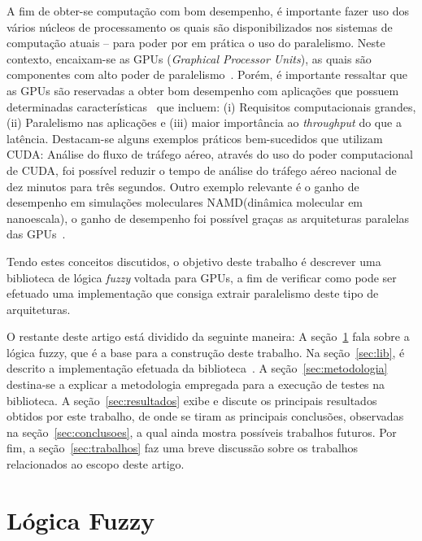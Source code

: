 \documentclass[12pt]{article}
\begin{document}
	A fim de obter-se computação com bom desempenho, é importante fazer uso dos vários núcleos de processamento os quais são disponibilizados nos sistemas de computação atuais -- para poder por em prática o uso do paralelismo. Neste contexto, encaixam-se as GPUs (\textit{Graphical Processor Units}), as quais são componentes com alto poder de paralelismo~\cite{sengupta:07}. Porém, é importante ressaltar que as GPUs são reservadas a obter bom desempenho com aplicações que possuem determinadas características~\cite{owens:08} que incluem: (i) Requisitos computacionais grandes, (ii) Paralelismo nas aplicações e (iii) maior importância ao \textit{throughput} do que a latência. Destacam-se alguns exemplos práticos bem-sucedidos que utilizam CUDA:
Análise do fluxo de tráfego aéreo, através do uso do poder computacional de CUDA, foi possível reduzir o tempo de análise do tráfego aéreo nacional
de dez minutos para três segundos. Outro exemplo relevante é o ganho de desempenho em simulações moleculares NAMD(dinâmica molecular em nanoescala), o ganho de desempenho foi possível graças as arquiteturas paralelas das GPUs~\cite{nvidia:15}.


	Tendo estes conceitos discutidos, o objetivo deste trabalho é descrever uma biblioteca de lógica \textit{fuzzy} voltada para GPUs, a fim de verificar como pode ser efetuado uma implementação que consiga extrair paralelismo deste tipo de arquiteturas.
	

	O restante deste artigo está dividido da seguinte maneira: A seção~\ref{sec:logfuzzy} fala sobre a lógica fuzzy, que é a base para a construção deste trabalho. Na seção~\ref{sec:lib}, é descrito a implementação efetuada da biblioteca~\libname. A seção~\ref{sec:metodologia} destina-se a explicar a metodologia empregada para a execução de testes na biblioteca. A seção~\ref{sec:resultados} exibe e discute os principais resultados obtidos por este trabalho, de onde se tiram as principais conclusões, observadas na seção~\ref{sec:conclusoes}, a qual ainda mostra possíveis trabalhos futuros. Por fim, a seção~\ref{sec:trabalhos} faz uma breve discussão sobre os trabalhos relacionados ao escopo deste artigo.

\section{Lógica Fuzzy}
\label{sec:logfuzzy}
\end{document}
